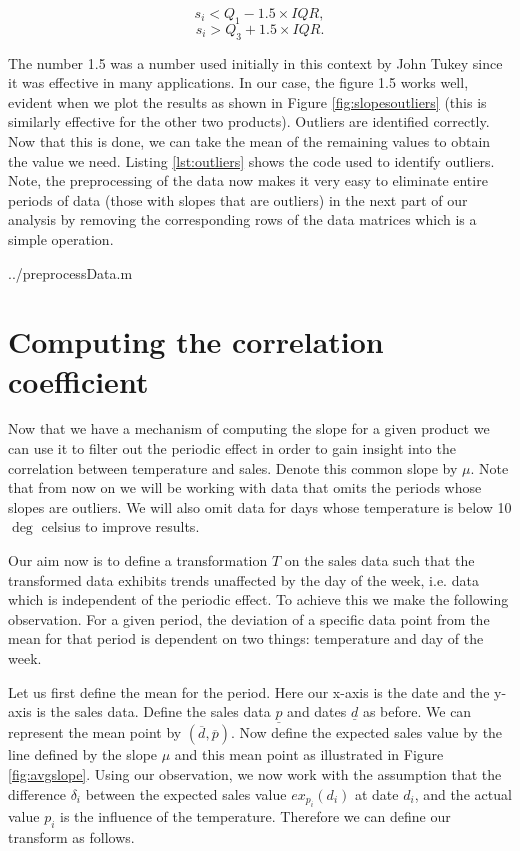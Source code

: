 $$
s_i < Q_1 - 1.5 \times IQR,
$$
$$
s_i > Q_3 + 1.5 \times IQR .
$$

The number 1.5 was a number used initially in this context by John Tukey \cite{tukey2} since it was effective in many applications. In our case, the figure 1.5 works well, evident when we plot the results as shown in Figure \ref{fig:slopesoutliers} (this is similarly effective for the other two products). Outliers are identified correctly. Now that this is done, we can take the mean of the remaining values to obtain the value we need. Listing \ref{lst:outliers} shows the code used to identify outliers. Note, the preprocessing of the data now makes it very easy to eliminate entire periods of data (those with slopes that are outliers) in the next part of our analysis by removing the corresponding rows of the data matrices which is a simple operation.

 {../preprocessData.m}

\section{Computing the correlation coefficient}

Now that we have a mechanism of computing the slope for a given product we can use it to filter out the periodic effect in order to gain insight into the correlation between temperature and sales. Denote this common slope by $\mu$. Note that from now on we will be working with data that omits the periods whose slopes are outliers. We will also omit data for days whose temperature is below 10 $\deg$ celsius to improve results.

Our aim now is to define a transformation $T$ on the sales data such that the transformed data exhibits trends unaffected by the day of the week, i.e. data which is independent of the periodic effect. To achieve this we make the following observation. For a given period, the deviation of a specific data point from the mean for that period is dependent on two things: temperature and day of the week. 

Let us first define the mean for the period. Here our x-axis is the date and the y-axis is the sales data. Define the sales data $\underline{p}$ and dates $\underline{d}$ as before. We can represent the mean point by $(\overline{d}, \overline{p})$. Now define the expected sales value by the line defined by the slope $\mu$ and this mean point as illustrated in Figure \ref{fig:avgslope}. Using our observation, we now work with the assumption that the difference $\delta_i$ between the expected sales value $ex_{p_i}(d_i)$ at date $d_i$, and the actual value $p_i$ is the influence of the temperature. Therefore we can define our transform as follows.


